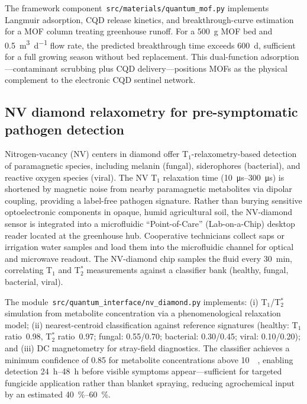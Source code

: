 \documentclass[11pt,a4paper]{article}
\begin{document}
The framework component~\texttt{src/materials/quantum\_mof.py} implements
Langmuir adsorption, CQD release kinetics, and breakthrough-curve estimation
for a MOF column treating greenhouse runoff. For a \qty{500}{\g} MOF bed and
\qty{0.5}{\m\cubed\per\day} flow rate, the predicted 
breakthrough time exceeds \qty{600}{\day}, sufficient for a full growing
season without bed replacement. This dual-function
adsorption---contaminant scrubbing plus CQD delivery---positions MOFs as the
physical complement to the electronic CQD sentinel network.

\subsection{NV diamond relaxometry for pre-symptomatic pathogen detection}
\label{SI-sec:nv_diamond}

Nitrogen-vacancy (NV) centers in diamond offer T$_1$-relaxometry-based
detection of paramagnetic species, including melanin (fungal), siderophores
(bacterial), and reactive oxygen species (viral). The NV T$_1$ relaxation time
(\qtyrange{10}{300}{\us}) is shortened by magnetic noise from nearby
paramagnetic metabolites via dipolar coupling, providing a label-free
pathogen signature. Rather than burying sensitive optoelectronic components in opaque, humid agricultural soil, the NV-diamond sensor is integrated into a microfluidic ``Point-of-Care'' (Lab-on-a-Chip) desktop reader located at the greenhouse hub. Cooperative technicians collect saps or irrigation water samples and load them into the microfluidic channel for optical and microwave readout. The NV-diamond chip
samples the fluid every \qty{30}{\minute}, correlating T$_1$ and T$_2^*$ measurements
against a classifier bank (healthy, fungal, bacterial, viral).

The module~\texttt{src/quantum\_interface/nv\_diamond.py} implements:
(i) T$_1$/T$_2^*$ simulation from metabolite concentration via a
phenomenological relaxation model; (ii) nearest-centroid classification
against reference signatures (healthy: T$_1$ ratio~0.98, T$_2^*$ ratio~0.97;
fungal: 0.55/0.70; bacterial: 0.30/0.45; viral: 0.10/0.20); and (iii) DC
magnetometry for stray-field diagnostics. The classifier achieves a
minimum confidence of 0.85 for metabolite concentrations above
\qty{10}{\micro\molar}, enabling detection \qtyrange{24}{48}{\hour} before visible symptoms
appear---sufficient for targeted fungicide application rather than blanket
spraying, reducing agrochemical input by an estimated \qtyrange{40}{60}{\percent}.
\end{document}
